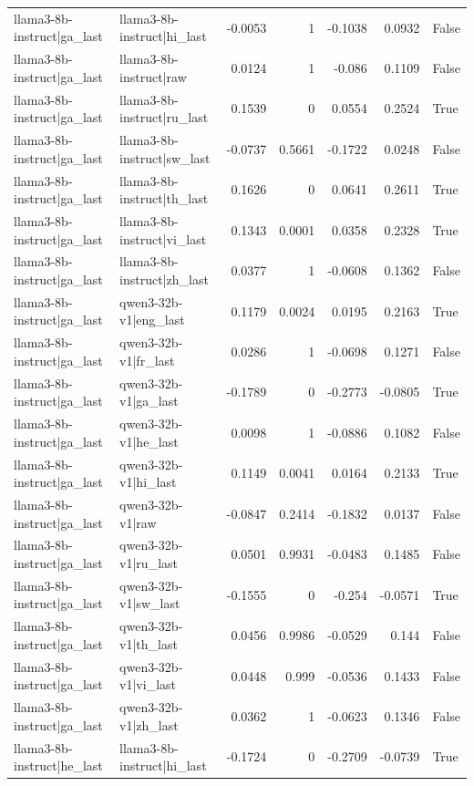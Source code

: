 \begin{table}
\begin{tabular}{l l r r r r l}
llama3-8b-instruct|ga_last & llama3-8b-instruct|hi_last & -0.0053 & 1 & -0.1038 & 0.0932 & False \\
llama3-8b-instruct|ga_last & llama3-8b-instruct|raw & 0.0124 & 1 & -0.086 & 0.1109 & False \\
llama3-8b-instruct|ga_last & llama3-8b-instruct|ru_last & 0.1539 & 0 & 0.0554 & 0.2524 & True \\
llama3-8b-instruct|ga_last & llama3-8b-instruct|sw_last & -0.0737 & 0.5661 & -0.1722 & 0.0248 & False \\
llama3-8b-instruct|ga_last & llama3-8b-instruct|th_last & 0.1626 & 0 & 0.0641 & 0.2611 & True \\
llama3-8b-instruct|ga_last & llama3-8b-instruct|vi_last & 0.1343 & 0.0001 & 0.0358 & 0.2328 & True \\
llama3-8b-instruct|ga_last & llama3-8b-instruct|zh_last & 0.0377 & 1 & -0.0608 & 0.1362 & False \\
llama3-8b-instruct|ga_last & qwen3-32b-v1|eng_last & 0.1179 & 0.0024 & 0.0195 & 0.2163 & True \\
llama3-8b-instruct|ga_last & qwen3-32b-v1|fr_last & 0.0286 & 1 & -0.0698 & 0.1271 & False \\
llama3-8b-instruct|ga_last & qwen3-32b-v1|ga_last & -0.1789 & 0 & -0.2773 & -0.0805 & True \\
llama3-8b-instruct|ga_last & qwen3-32b-v1|he_last & 0.0098 & 1 & -0.0886 & 0.1082 & False \\
llama3-8b-instruct|ga_last & qwen3-32b-v1|hi_last & 0.1149 & 0.0041 & 0.0164 & 0.2133 & True \\
llama3-8b-instruct|ga_last & qwen3-32b-v1|raw & -0.0847 & 0.2414 & -0.1832 & 0.0137 & False \\
llama3-8b-instruct|ga_last & qwen3-32b-v1|ru_last & 0.0501 & 0.9931 & -0.0483 & 0.1485 & False \\
llama3-8b-instruct|ga_last & qwen3-32b-v1|sw_last & -0.1555 & 0 & -0.254 & -0.0571 & True \\
llama3-8b-instruct|ga_last & qwen3-32b-v1|th_last & 0.0456 & 0.9986 & -0.0529 & 0.144 & False \\
llama3-8b-instruct|ga_last & qwen3-32b-v1|vi_last & 0.0448 & 0.999 & -0.0536 & 0.1433 & False \\
llama3-8b-instruct|ga_last & qwen3-32b-v1|zh_last & 0.0362 & 1 & -0.0623 & 0.1346 & False \\
llama3-8b-instruct|he_last & llama3-8b-instruct|hi_last & -0.1724 & 0 & -0.2709 & -0.0739 & True \\

\end{tabular}
\end{table}
